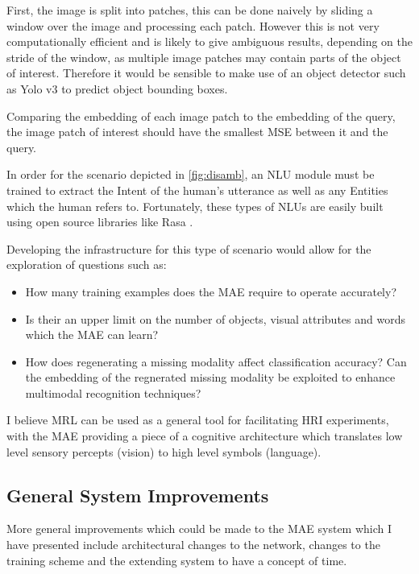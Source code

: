 First, the image is split into patches, this can be done naively by sliding a window over the image and processing each patch. However this is not very computationally efficient and is likely to give ambiguous results, depending on the stride of the window, as multiple image patches may contain parts of the object of interest. Therefore it would be sensible to make use of an object detector such as Yolo v3 \cite{redmon2018yolov3} to predict object bounding boxes.

Comparing the embedding of each image patch to the embedding of the query, the image patch of interest should have the smallest \ac{MSE} between it and the query.

In order for the scenario depicted in \autoref{fig:disamb}, an \ac{NLU} module must be trained to extract the Intent of the human's utterance as well as any Entities which the human refers to. Fortunately, these types of \acp{NLU} are easily built using open source libraries like Rasa \cite{rasa}.



Developing the infrastructure for this type of scenario would allow for the exploration of questions such as:

\begin{itemize}
\item How many training examples does the \ac{MAE} require to operate accurately?
\item Is their an upper limit on the number of objects, visual attributes and words which the \ac{MAE} can learn?
\item How does regenerating a missing modality affect classification accuracy? Can the embedding of the regnerated missing modality be exploited to enhance  multimodal recognition techniques?
\end{itemize}

I believe \ac{MRL} can be used as a general tool for facilitating \ac{HRI} experiments, with the \ac{MAE} providing a piece of a cognitive architecture which translates low level sensory percepts (vision) to high level symbols (language).



\subsection{General System Improvements}
More general improvements which could be made to the \ac{MAE} system which I have presented include architectural changes to the network, changes to the training scheme and the extending system to have a concept of time.

